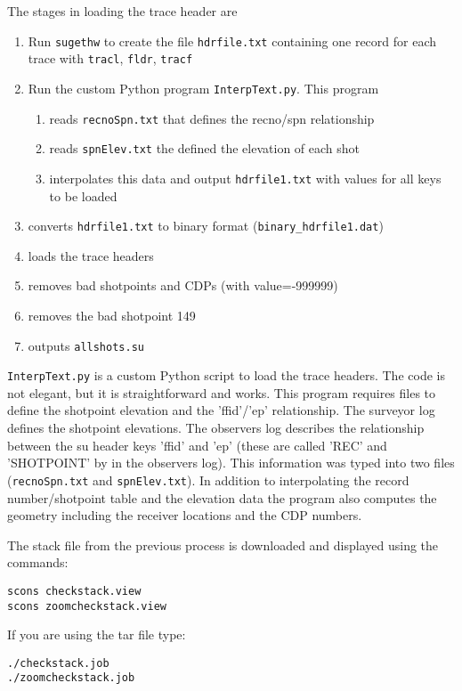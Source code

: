 The stages in loading the trace header are
\begin{enumerate}
\item Run \texttt{sugethw} to create the file \texttt{hdrfile.txt} containing one record for 
each trace with \texttt{tracl}, \texttt{fldr}, \texttt{tracf}
\item Run the custom Python program \texttt{InterpText.py}.  This program
\begin{enumerate}
\item reads \texttt{recnoSpn.txt} that defines the recno/spn relationship
\item reads \texttt{spnElev.txt}  the defined the elevation of each shot
\item interpolates this data and output \texttt{hdrfile1.txt} with values for all keys
to be loaded
\end{enumerate}
\item converts \texttt{hdrfile1.txt} to binary format 
(\texttt{binary\_hdrfile1.dat})
\item loads the trace headers
\item removes bad shotpoints and CDPs (with value=-999999)
\item removes the bad shotpoint 149
\item outputs \texttt{allshots.su}
\end{enumerate}

\texttt{InterpText.py} is a custom Python script to load the trace headers.  
The code is not elegant, but it is straightforward and works.  This program 
requires files to define the shotpoint elevation and the 'ffid'/'ep' 
relationship.  The surveyor log defines the shotpoint elevations.  The 
observers log describes the relationship between the su header keys 
'ffid' and 'ep' (these are called 'REC' and 'SHOTPOINT' by in the observers 
log).  This information was typed into two files (\texttt{recnoSpn.txt} and 
\texttt{spnElev.txt}).  In addition to interpolating the record 
number/shotpoint table and the elevation data the program also computes 
the geometry including the receiver locations and the CDP numbers.

The stack file from the previous process is downloaded and displayed 
using the commands: 
\begin{verbatim}
scons checkstack.view 
scons zoomcheckstack.view
\end{verbatim}
If you are using the tar file type:
\begin{verbatim}
./checkstack.job
./zoomcheckstack.job
\end{verbatim}

